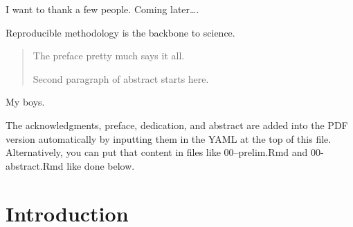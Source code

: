 



	\usepackage{setspace}\onehalfspacing
%


  \maketitle

\frontmatter %
\pagestyle{empty} %
  \begin{acknowledgements}
    I want to thank a few people. Coming later\ldots.
  \end{acknowledgements}
  \begin{preface}
    Reproducible methodology is the backbone to science.
  \end{preface}
  \hypersetup{linkcolor=black}
  \setcounter{secnumdepth}{2}
  \setcounter{tocdepth}{2}
  \tableofcontents

  \listoftables

  \listoffigures
  \begin{abstract}
    The preface pretty much says it all.

    \par

    Second paragraph of abstract starts here.
  \end{abstract}
  \begin{dedication}
    My boys.
  \end{dedication}
\mainmatter %
\pagestyle{fancyplain} %

The acknowledgments, preface, dedication, and abstract are added into the PDF
version automatically by inputting them in the YAML at the top of this file.
Alternatively, you can put that content in files like 00--prelim.Rmd and
00-abstract.Rmd like done below.

\hypertarget{introduction}{%
\chapter*{Introduction}\label{introduction}}

